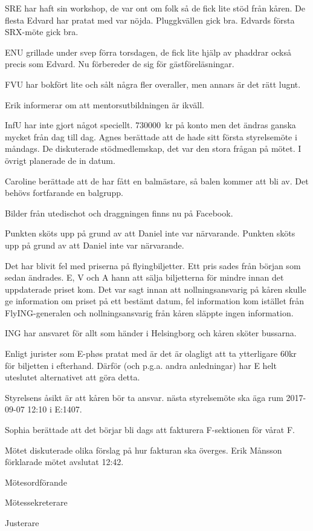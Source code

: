 \documentclass[10pt]{article}
\def\mo{Erik Månsson}
\def\ms{Johan Karlberg}
\def\ji{Sophia Grimmeiss Grahm}
\begin{document}
\begin{paragrafer}
\begin{paragrafer}
SRE har haft sin workshop, de var ont om folk så de fick lite stöd från kåren. De flesta Edvard har pratat med var nöjda. Pluggkvällen gick bra. Edvards första SRX-möte gick bra.

ENU grillade under svep förra torsdagen, de fick lite hjälp av phaddrar också precis som Edvard. Nu förbereder de sig för gästföreläsningar.

FVU har bokfört lite och sålt några fler overaller, men annars är det rätt lugnt.

Erik informerar om att mentorsutbildningen är ikväll.

InfU har inte gjort något speciellt.
\SI{730000}{kr} på konto men det ändras ganska mycket från dag till dag.
Agnes berättade att de hade sitt första styrelsemöte i måndags. De diskuterade stödmedlemskap, det var den stora frågan på mötet. I övrigt planerade de in datum.

Caroline berättade att de har fått en balmästare, så balen kommer att bli av. Det behövs fortfarande en balgrupp.

Bilder från utedischot och draggningen finns nu på Facebook.
\end{paragrafer}

Punkten sköts upp på grund av att Daniel inte var närvarande.
Punkten sköts upp på grund av att Daniel inte var närvarande.

Det har blivit fel med priserna på flyingbiljetter. Ett pris sades från början som sedan ändrades. E, V och A hann att sälja biljetterna för mindre innan det uppdaterade priset kom.
\newpage
Det var sagt innan att nollningsansvarig på kåren skulle ge information om priset på ett bestämt datum, fel information kom istället från FlyING-generalen och nollningsansvarig från kåren släppte ingen information.

ING har ansvaret för allt som händer i Helsingborg och kåren sköter bussarna.

Enligt jurister som E-phøs pratat med är det är olagligt att ta ytterligare 60kr för biljetten i efterhand. Därför (och p.g.a. andra anledningar) har E helt uteslutet alternativet att göra detta.

Styrelsens åsikt är att kåren bör ta ansvar.
{\Mba} nästa styrelsemöte ska äga rum 2017-09-07 12:10 i E:1407.

{\Ibfu}

Sophia berättade att det börjar bli dags att fakturera F-sektionen för vårat F.

Mötet diskuterade olika förslag på hur fakturan ska överges.
{\mo} förklarade mötet avslutat 12:42.

\end{paragrafer}

\hidesignfoot
\begin{signatures}{3}
\signature{\mo}{Mötesordförande}
\signature{\ms}{Mötessekreterare}
\signature{\ji}{Justerare}
\end{signatures}
\end{document}
